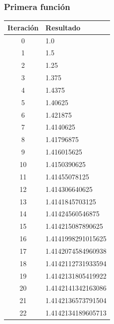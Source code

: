 \documentclass[titlepage,a4paper]{article}
\begin{document}
\subsubsection{Primera función}\label{sec:bis1}
\begin{multicols}{2}
\begin{center}
\begin{tabular}{| c | l |}
\hline
        Iteración & Resultado \\ \hline
0     &  1.0 \\
1     &  1.5 \\
2     &  1.25 \\
3     &  1.375 \\
4     &  1.4375 \\
5     &  1.40625 \\
6     &  1.421875 \\
7     &  1.4140625 \\
8     &  1.41796875 \\
9     &  1.416015625 \\
10     &  1.4150390625 \\
11     &  1.41455078125 \\
12     &  1.414306640625 \\
13     &  1.4141845703125 \\
14     &  1.41424560546875 \\
15     &  1.414215087890625 \\
16     &  1.4141998291015625 \\
17     &  1.4142074584960938 \\
18     &  1.4142112731933594 \\
19     &  1.4142131805419922 \\
20     &  1.4142141342163086 \\
21     &  1.4142136573791504 \\
22     &  1.4142134189605713 \\

\hline
\end{tabular}
\end{center}


\end{multicols}
\end{document}

